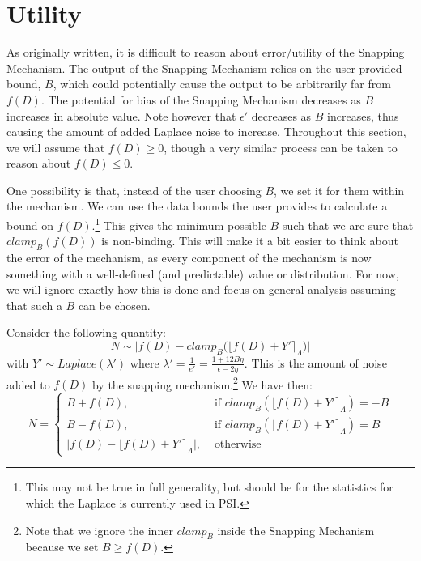 \documentclass[11pt]{scrartcl} %
\begin{document}
\section{Utility}
As originally written, it is difficult to reason about error/utility of the Snapping Mechanism. The output of the Snapping Mechanism relies on the user-provided bound, $B$, which could potentially cause the output to be arbitrarily far from $f(D)$. The potential for bias of the Snapping Mechanism decreases as $B$ increases in absolute value. Note however that $\epsilon'$ decreases as $B$ increases, thus causing the amount of added Laplace noise to increase. Throughout this section, we will assume that $f(D) \geq 0$, though a very similar process can be taken to reason about $f(D) \leq 0$. \newline

One possibility is that, instead of the user choosing $B$, we set it for them within the mechanism. We can use the data bounds the user provides to calculate a bound on $f(D)$.\footnote{This may not be true in full generality, but should be for the statistics for which the Laplace is currently used in PSI.} This gives the minimum possible $B$ such that we are sure that $clamp_B \left( f(D) \right)$ is non-binding. This will make it a bit easier to think about the error of the mechanism, as every component of the mechanism is now something with a well-defined (and predictable) value or distribution. For now, we will ignore exactly how this is done and focus on general analysis assuming that such a $B$ can be chosen. \newline

Consider the following quantity:
\[ N \sim \big \vert f(D) - clamp_B \big( \lfloor f(D) + Y' \rceil_{\Lambda} \big) \big \vert \]
with $Y' \sim Laplace(\lambda')$ where $\lambda' = \frac{1}{e'} = \frac{1 + 12B \eta}{\epsilon - 2\eta}$. This is the amount of noise added to $f(D)$ by the snapping mechanism.\footnote{Note that we ignore the inner $clamp_B$ inside the Snapping Mechanism because we set $B \geq f(D)$.} We have then:
\begin{equation}
	N =
		\label{snapped_noise}
		\begin{cases}
			B + f(D), &\text{ if } clamp_B \left( \lfloor f(D) + Y' \rceil_{\Lambda} \right) = -B  \\
			B - f(D), &\text{ if } clamp_B \left( \lfloor f(D) + Y' \rceil_{\Lambda} \right) = B  \\
			\big\vert f(D) - \lfloor f(D) + Y' \rceil_{\Lambda} \big\vert, &\text{ otherwise }
		\end{cases}
\end{equation}
\end{document}
